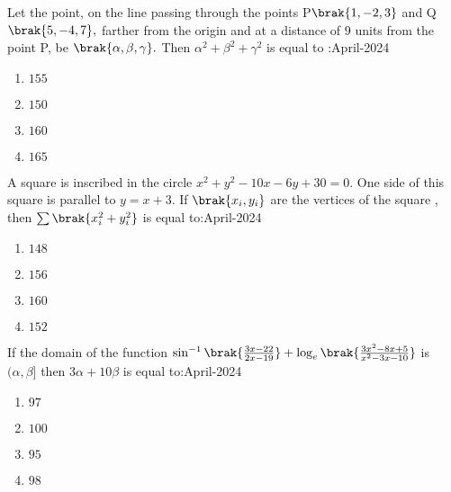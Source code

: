 \iffalse
\title{04-04-2024}
\author{AI24BTECH11032}
\section{mcq-single}
\fi

\item Let the point, on the line passing through the points P$\brak{1,-2,3}$ and Q$\brak{5,-4,7},$ farther from the origin and at a distance of $9$ units from the point P, be $\brak{\alpha,\beta,\gamma}.$ Then $\alpha^{2}+\beta^{2}+\gamma^{2}$ is equal to :\hfill{April-2024}
\begin{multicols}{2}
    \begin{enumerate}
        \item $155$
        \item $150$
        \item $160$
        \item $165$
    \end{enumerate}
\end{multicols}

\item A square is inscribed in the circle $x^{2}+y^{2}-10x-6y+30=0.$ One side of this square is parallel to $y = x + 3. $
	If $\brak{x_i,y_i}$ are the vertices of the square , then $\sum \brak{x_i^{2}+y_i^{2}}$ is equal to:\hfill{April-2024}
\begin{multicols}{2}
    \begin{enumerate}
        \item $148$
        \item $156$
        \item $160$
        \item $152$
    \end{enumerate}
\end{multicols}

\item If the domain of the function $\sin^{-1}\brak{\frac{3x - 22}{2x - 19}} + \log_e\brak{\frac{3x^2 - 8x + 5}{x^2 - 3x - 10}}$ is $(\alpha,\beta]$ then $3\alpha+10\beta$ is equal to:\hfill{April-2024}
\begin{multicols}{2}
    \begin{enumerate}
        \item $97$
        \item $100$
        \item $95$
        \item $98$
    \end{enumerate}
\end{multicols}

